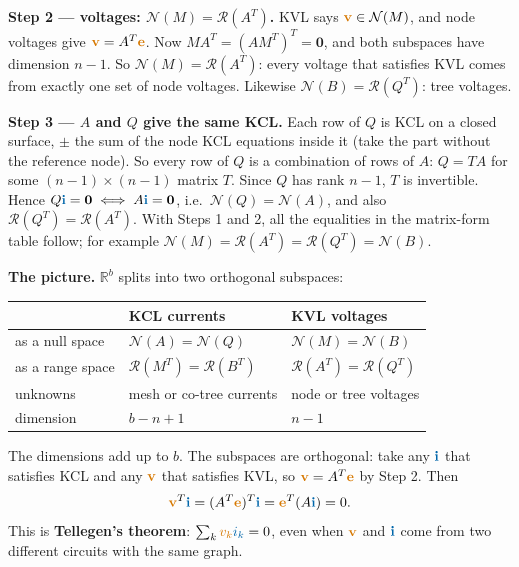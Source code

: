 \documentclass[11pt,a4paper]{article}
\newcommand{\Icol}[1]{\textcolor{ccur}{#1}}
\newcommand{\Vcol}[1]{\textcolor{cvolt}{#1}}
\begin{document}
\textbf{Step 2 --- voltages: $\mathcal{N}(M) = \mathcal{R}(A^T)$.} KVL says
$\Vcol{\mathbf{v}} \in \mathcal{N}(M)$, and node voltages give
$\Vcol{\mathbf{v}} = A^T\Vcol{\mathbf{e}}$. Now $MA^T = (AM^T)^T = \mathbf{0}$, and both
subspaces have dimension $n-1$. So $\mathcal{N}(M) = \mathcal{R}(A^T)$: every voltage that
satisfies KVL comes from exactly one set of node voltages. Likewise
$\mathcal{N}(B) = \mathcal{R}(Q^T)$: tree voltages.

\textbf{Step 3 --- $A$ and $Q$ give the same KCL.} Each row of $Q$ is KCL on a closed surface,
$\pm$ the sum of the node KCL equations inside it (take the part without the reference node). So every row of $Q$ is a combination of rows of
$A$: $Q = TA$ for some $(n-1)\times(n-1)$ matrix $T$. Since $Q$ has rank $n-1$, $T$ is
invertible. Hence $Q\Icol{\mathbf{i}} = \mathbf{0} \iff A\Icol{\mathbf{i}} = \mathbf{0}$, i.e.\
$\mathcal{N}(Q) = \mathcal{N}(A)$, and also $\mathcal{R}(Q^T) = \mathcal{R}(A^T)$. With Steps 1
and 2, all the equalities in the matrix-form table follow; for example
$\mathcal{N}(M) = \mathcal{R}(A^T) = \mathcal{R}(Q^T) = \mathcal{N}(B)$.

\textbf{The picture.} $\mathbb{R}^b$ splits into two orthogonal subspaces:
\begin{center}
\renewcommand{\arraystretch}{1.3}
\begin{tabular}{@{}l l l@{}}
\toprule
 & \Icol{KCL currents} & \Vcol{KVL voltages}\\
\midrule
as a null space  & $\mathcal{N}(A) = \mathcal{N}(Q)$ & $\mathcal{N}(M) = \mathcal{N}(B)$\\
as a range space & $\mathcal{R}(M^T) = \mathcal{R}(B^T)$ & $\mathcal{R}(A^T) = \mathcal{R}(Q^T)$\\
unknowns         & mesh or co-tree currents & node or tree voltages\\
dimension        & $b-n+1$ & $n-1$\\
\bottomrule
\end{tabular}
\end{center}
The dimensions add up to $b$. The subspaces are orthogonal: take any $\Icol{\mathbf{i}}$ that
satisfies KCL and any $\Vcol{\mathbf{v}}$ that satisfies KVL, so $\Vcol{\mathbf{v}} = A^T\Vcol{\mathbf{e}}$ by Step 2. Then
\[
  \Vcol{\mathbf{v}}^T\Icol{\mathbf{i}} = (A^T\Vcol{\mathbf{e}})^T\Icol{\mathbf{i}}
  = \Vcol{\mathbf{e}}^T (A\Icol{\mathbf{i}}) = 0 .
\]
This is \textbf{Tellegen's theorem}: $\sum_k \Vcol{v_k}\Icol{i_k} = 0$, even when $\Vcol{\mathbf{v}}$
and $\Icol{\mathbf{i}}$ come from two different circuits with the same graph.
\end{document}
